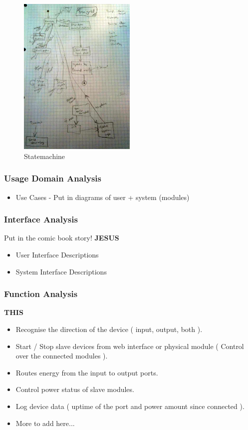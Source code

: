 			\begin{figure}[h!]		%
				\begin{centering}
					 \includegraphics[width=0.5\textwidth]{images/statemachine.JPG}
		 			\caption{Statemachine}
			 	\end{centering}
			\end{figure}

	\subsubsection{Usage Domain Analysis}
		\begin{itemize}
			\item Use Cases - Put in diagrams of user + system (modules)
		\end{itemize}
	\subsubsection{Interface Analysis}
			Put in the comic book story!  \textbf{JESUS}
		\begin{itemize}
			\item User Interface Descriptions
				
			\item System Interface Descriptions
		\end{itemize}
	\subsubsection{Function Analysis}
	 \textbf{THIS}
		\begin{itemize}
			\item Recognise the direction of the device ( input, output, both ).
			\item Start / Stop slave devices from web interface or physical module ( Control over the connected modules ).
			\item Routes energy from the input to output ports.
			\item Control power status of slave modules.
			\item Log device data ( uptime of the port and power amount since connected ).
			\item More to add here...
		\end{itemize}
